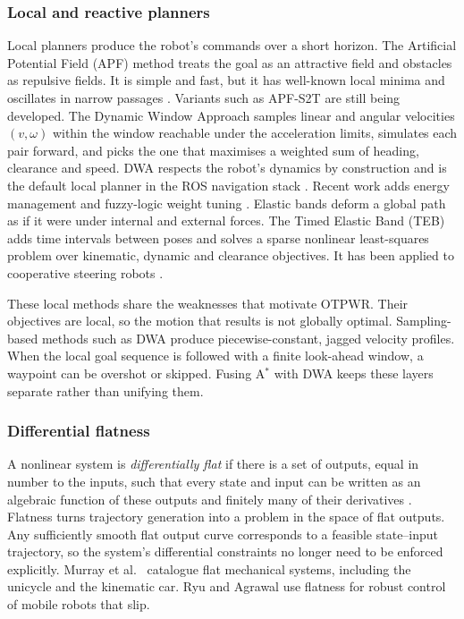 \documentclass[11pt,a4paper]{article}
\begin{document}
\subsubsection{Local and reactive planners}
\label{sec:lit-local}

Local planners produce the robot's commands over a short horizon. The
Artificial Potential Field (APF) method \citep{khatib1986realtime} treats the
goal as an attractive field and obstacles as repulsive fields. It is simple
and fast, but it has well-known local minima and oscillates in narrow
passages \citep{koren1991potential}. Variants such as APF-S2T
\citep{chen2024apf} are still being developed. The Dynamic Window Approach
\citep{fox1997dwa} samples linear and angular velocities $(v,\omega)$ within
the window reachable under the acceleration limits, simulates each pair
forward, and picks the one that maximises a weighted sum of heading,
clearance and speed. DWA respects the robot's dynamics by construction and
is the default local planner in the ROS navigation stack
\citep{marder2010office}. Recent work adds energy management and fuzzy-logic
weight tuning \citep{yao2024improved}. Elastic bands
\citep{quinlan1993elastic} deform a global path as if it were under internal
and external forces. The Timed Elastic Band (TEB)
\citep{rosmann2012teb,rosmann2017integrated} adds time intervals between
poses and solves a sparse nonlinear least-squares problem over kinematic,
dynamic and clearance objectives. It has been applied to cooperative
steering robots \citep{sun2022solution}.

These local methods share the weaknesses that motivate OTPWR. Their
objectives are local, so the motion that results is not globally optimal.
Sampling-based methods such as DWA produce piecewise-constant, jagged
velocity profiles. When the local goal sequence is followed with a finite
look-ahead window, a waypoint can be overshot or skipped. Fusing A$^\ast$
with DWA \citep{liu2023kinematically} keeps these layers separate rather than
unifying them.

\subsubsection{Differential flatness}
\label{sec:lit-flat}

A nonlinear system is \emph{differentially flat} if there is a set of outputs,
equal in number to the inputs, such that every state and input can be written
as an algebraic function of these outputs and finitely many of their
derivatives \citep{fliess1995flatness}. Flatness turns trajectory generation
into a problem in the space of flat outputs. Any sufficiently smooth flat
output curve corresponds to a feasible state--input trajectory, so the
system's differential constraints no longer need to be enforced explicitly.
Murray et al.\ \citep{murray1995flat} catalogue flat mechanical systems,
including the unicycle and the kinematic car. Ryu and Agrawal
\citep{ryu2011differential} use flatness for robust control of mobile robots
that slip.
\end{document}
